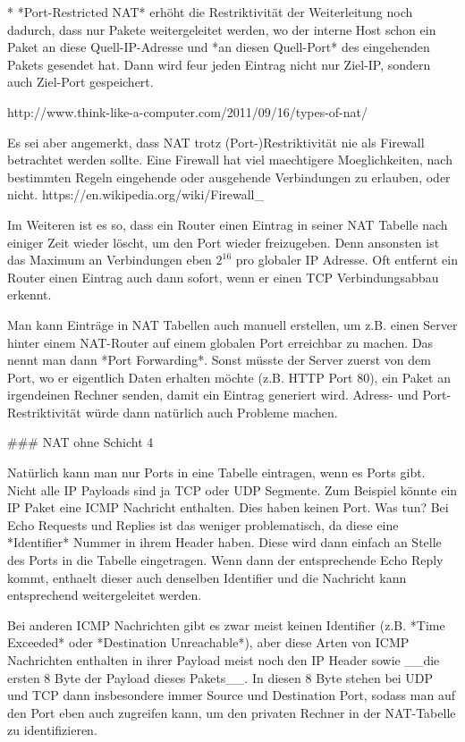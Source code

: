 * *Port-Restricted NAT* erhöht die Restriktivität der Weiterleitung noch
  dadurch, dass nur Pakete weitergeleitet werden, wo der interne Host schon ein
  Paket an diese Quell-IP-Adresse und *an diesen Quell-Port* des eingehenden
  Pakets gesendet hat. Dann wird feur jeden Eintrag nicht nur Ziel-IP, sondern
  auch Ziel-Port gespeichert.

http://www.think-like-a-computer.com/2011/09/16/types-of-nat/

Es sei aber angemerkt, dass NAT trotz (Port-)Restriktivität nie als Firewall
betrachtet werden sollte. Eine Firewall hat viel maechtigere Moeglichkeiten,
nach bestimmten Regeln eingehende oder ausgehende Verbindungen zu erlauben, oder
nicht. https://en.wikipedia.org/wiki/Firewall_%

Im Weiteren ist es so, dass ein Router einen Eintrag in seiner NAT Tabelle nach
einiger Zeit wieder löscht, um den Port wieder freizugeben. Denn ansonsten ist
das Maximum an Verbindungen eben $2^16$ pro globaler IP Adresse. Oft entfernt
ein Router einen Eintrag auch dann sofort, wenn er einen TCP Verbindungsabbau
erkennt.

Man kann Einträge in NAT Tabellen auch manuell erstellen, um z.B. einen Server
hinter einem NAT-Router auf einem globalen Port erreichbar zu machen. Das nennt
man dann *Port Forwarding*. Sonst müsste der Server zuerst von dem Port, wo er
eigentlich Daten erhalten möchte (z.B. HTTP Port 80), ein Paket an irgendeinen
Rechner senden, damit ein Eintrag generiert wird. Adress- und
Port-Restriktivität würde dann natürlich auch Probleme machen.

### NAT ohne Schicht 4

Natürlich kann man nur Ports in eine Tabelle eintragen, wenn es Ports
gibt. Nicht alle IP Payloads sind ja TCP oder UDP Segmente. Zum Beispiel könnte
ein IP Paket eine ICMP Nachricht enthalten. Dies haben keinen Port. Was tun? Bei
Echo Requests und Replies ist das weniger problematisch, da diese eine
*Identifier* Nummer in ihrem Header haben. Diese wird dann einfach an Stelle
des Ports in die Tabelle eingetragen. Wenn dann der entsprechende Echo Reply
kommt, enthaelt dieser auch denselben Identifier und die Nachricht kann
entsprechend weitergeleitet werden.

Bei anderen ICMP Nachrichten gibt es zwar meist keinen Identifier (z.B. *Time
Exceeded* oder *Destination Unreachable*), aber diese Arten von ICMP Nachrichten
enthalten in ihrer Payload meist noch den IP Header sowie __die ersten 8 Byte
der Payload dieses Pakets__. In diesen 8 Byte stehen bei UDP und TCP dann
insbesondere immer Source und Destination Port, sodass man auf den Port eben
auch zugreifen kann, um den privaten Rechner in der NAT-Tabelle zu
identifizieren.

